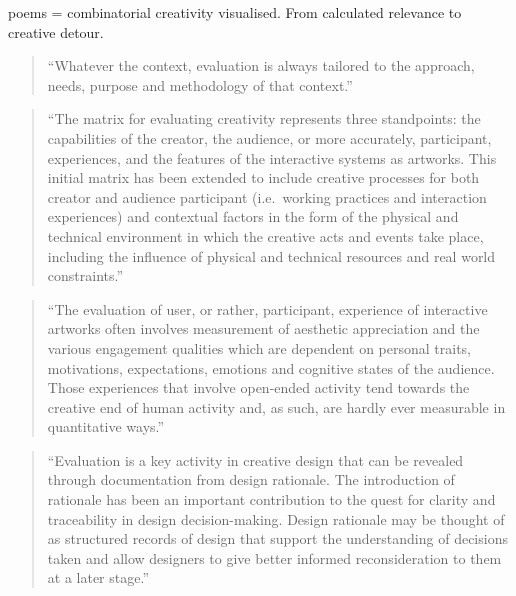 \begin{fcom}
  poems = combinatorial creativity visualised.
  From calculated relevance to creative detour.
\end{fcom}



\grule


\begin{quote}
  ``Whatever the context, evaluation is always tailored to the approach, needs, purpose and methodology of that context.'' \autocite[p.7]{Candy2012}
\end{quote}

\begin{quote}
  ``The matrix for evaluating creativity represents three standpoints: the capabilities of the creator, the audience, or more accurately, participant, experiences, and the features of the interactive systems as artworks. This initial matrix has been extended to include creative processes for both creator and audience participant (i.e.\ working practices and interaction experiences) and contextual factors in the form of the physical and technical environment in which the creative acts and events take place, including the influence of physical and technical resources and real world constraints.'' \autocite[p.7-8]{Candy2012}
\end{quote}

\begin{quote}
  ``The evaluation of user, or rather, participant, experience of interactive artworks often involves measurement of aesthetic appreciation and the various engagement qualities which are dependent on personal traits, motivations, expectations, emotions and cognitive states of the audience. Those experiences that involve open-ended activity tend towards the creative end of human activity and, as such, are hardly ever measurable in quantitative ways.''  \autocite[p.8]{Candy2012}
\end{quote}

\begin{quote}
  ``Evaluation is a key activity in creative design that can be revealed through documentation from design rationale. The introduction of rationale has been an important contribution to the quest for clarity and traceability in design decision-making. Design rationale may be thought of as structured records of design that support the understanding of decisions taken and allow designers to give better informed reconsideration to them at a later stage.'' \autocite[p.9]{Candy2012}
\end{quote}

